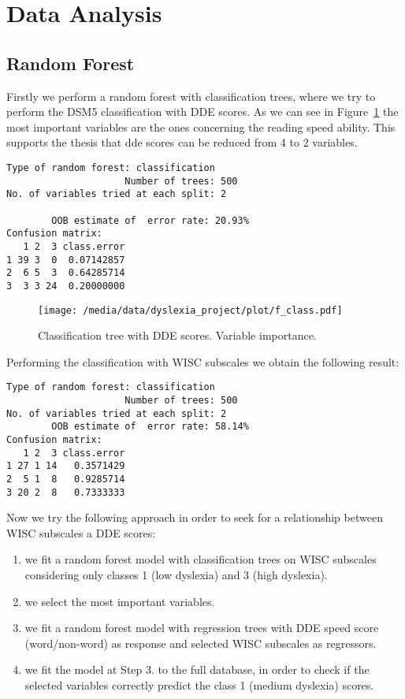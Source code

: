 \documentclass[11pt, a4paper, twoside, openright]{article}
\begin{document}
\clearpage

\section{Data Analysis}
\subsection{Random Forest}
Firstly we perform a random forest with classification trees, where we
try to perform the DSM5 classification with DDE scores.  As we can see
in Figure~\ref{fig:14} the most important variables are the ones
concerning the reading speed ability. This supports the thesis that
dde scores can be reduced from 4 to 2 variables.
\begin{verbatim}
Type of random forest: classification
                     Number of trees: 500
No. of variables tried at each split: 2

        OOB estimate of  error rate: 20.93%
Confusion matrix:
   1 2  3 class.error
1 39 3  0  0.07142857
2  6 5  3  0.64285714
3  3 3 24  0.20000000
\end{verbatim}
\begin{figure}[h!] 
\centering
\texttt{[image: /media/data/dyslexia\_project/plot/f\_class.pdf]}
\caption{Classification tree with DDE scores. Variable importance.}
\label{fig:14}
\end{figure} 

Performing the classification with WISC subscales we obtain the following result:
\begin{verbatim}
Type of random forest: classification
                     Number of trees: 500
No. of variables tried at each split: 2
        OOB estimate of  error rate: 58.14%
Confusion matrix:
   1 2  3 class.error
1 27 1 14   0.3571429
2  5 1  8   0.9285714
3 20 2  8   0.7333333
\end{verbatim}

Now we try the following approach in order to seek for a relationship
between WISC subscales a DDE scores:
\begin{enumerate}
\item we fit a random forest model with classification trees on WISC
  subscales considering only classes 1 (low dyslexia) and 3 (high
  dyslexia).
\item we select the most important variables.
\item we fit a random forest model with regression trees with DDE
  speed score (word/non-word) as response and selected WISC subscales
  as regressors.
\item we fit the model at Step 3. to the full database, in order to
  check if the selected variables correctly predict the class 1
  (medium dyslexia) scores.
\end{enumerate}
\end{document}

